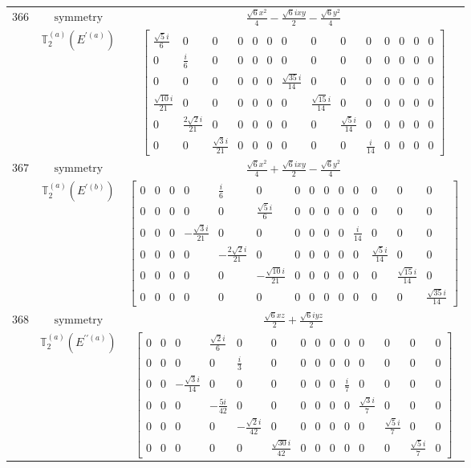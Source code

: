 \documentclass[fleqn,8pt,landscape]{jsarticle}
\begin{document}
\begin{longtable}{ccc}
$ 366 $ & $ \text{symmetry} $ & $ \frac{\sqrt{6} x^{2}}{4} - \frac{\sqrt{6} i x y}{2} - \frac{\sqrt{6} y^{2}}{4} $ \\
$  $ & $ \mathbb{T}_{2}^{(a)}(E^{\prime(a)}) $ & $ \begin{bmatrix} \frac{\sqrt{5} i}{6} & 0 & 0 & 0 & 0 & 0 & 0 & 0 & 0 & 0 & 0 & 0 & 0 & 0 \\ 0 & \frac{i}{6} & 0 & 0 & 0 & 0 & 0 & 0 & 0 & 0 & 0 & 0 & 0 & 0 \\ 0 & 0 & 0 & 0 & 0 & 0 & \frac{\sqrt{35} i}{14} & 0 & 0 & 0 & 0 & 0 & 0 & 0 \\ \frac{\sqrt{10} i}{21} & 0 & 0 & 0 & 0 & 0 & 0 & \frac{\sqrt{15} i}{14} & 0 & 0 & 0 & 0 & 0 & 0 \\ 0 & \frac{2 \sqrt{2} i}{21} & 0 & 0 & 0 & 0 & 0 & 0 & \frac{\sqrt{5} i}{14} & 0 & 0 & 0 & 0 & 0 \\ 0 & 0 & \frac{\sqrt{3} i}{21} & 0 & 0 & 0 & 0 & 0 & 0 & \frac{i}{14} & 0 & 0 & 0 & 0 \end{bmatrix} $ \\ \hline
$ 367 $ & $ \text{symmetry} $ & $ \frac{\sqrt{6} x^{2}}{4} + \frac{\sqrt{6} i x y}{2} - \frac{\sqrt{6} y^{2}}{4} $ \\
$  $ & $ \mathbb{T}_{2}^{(a)}(E^{\prime(b)}) $ & $ \begin{bmatrix} 0 & 0 & 0 & 0 & \frac{i}{6} & 0 & 0 & 0 & 0 & 0 & 0 & 0 & 0 & 0 \\ 0 & 0 & 0 & 0 & 0 & \frac{\sqrt{5} i}{6} & 0 & 0 & 0 & 0 & 0 & 0 & 0 & 0 \\ 0 & 0 & 0 & - \frac{\sqrt{3} i}{21} & 0 & 0 & 0 & 0 & 0 & 0 & \frac{i}{14} & 0 & 0 & 0 \\ 0 & 0 & 0 & 0 & - \frac{2 \sqrt{2} i}{21} & 0 & 0 & 0 & 0 & 0 & 0 & \frac{\sqrt{5} i}{14} & 0 & 0 \\ 0 & 0 & 0 & 0 & 0 & - \frac{\sqrt{10} i}{21} & 0 & 0 & 0 & 0 & 0 & 0 & \frac{\sqrt{15} i}{14} & 0 \\ 0 & 0 & 0 & 0 & 0 & 0 & 0 & 0 & 0 & 0 & 0 & 0 & 0 & \frac{\sqrt{35} i}{14} \end{bmatrix} $ \\ \hline
$ 368 $ & $ \text{symmetry} $ & $ \frac{\sqrt{6} x z}{2} + \frac{\sqrt{6} i y z}{2} $ \\
$  $ & $ \mathbb{T}_{2}^{(a)}(E^{\prime\prime(a)}) $ & $ \begin{bmatrix} 0 & 0 & 0 & \frac{\sqrt{2} i}{6} & 0 & 0 & 0 & 0 & 0 & 0 & 0 & 0 & 0 & 0 \\ 0 & 0 & 0 & 0 & \frac{i}{3} & 0 & 0 & 0 & 0 & 0 & 0 & 0 & 0 & 0 \\ 0 & 0 & - \frac{\sqrt{3} i}{14} & 0 & 0 & 0 & 0 & 0 & 0 & \frac{i}{7} & 0 & 0 & 0 & 0 \\ 0 & 0 & 0 & - \frac{5 i}{42} & 0 & 0 & 0 & 0 & 0 & 0 & \frac{\sqrt{3} i}{7} & 0 & 0 & 0 \\ 0 & 0 & 0 & 0 & - \frac{\sqrt{2} i}{42} & 0 & 0 & 0 & 0 & 0 & 0 & \frac{\sqrt{5} i}{7} & 0 & 0 \\ 0 & 0 & 0 & 0 & 0 & \frac{\sqrt{30} i}{42} & 0 & 0 & 0 & 0 & 0 & 0 & \frac{\sqrt{5} i}{7} & 0 \end{bmatrix} $ \\ \hline

\end{longtable}
\end{document}
